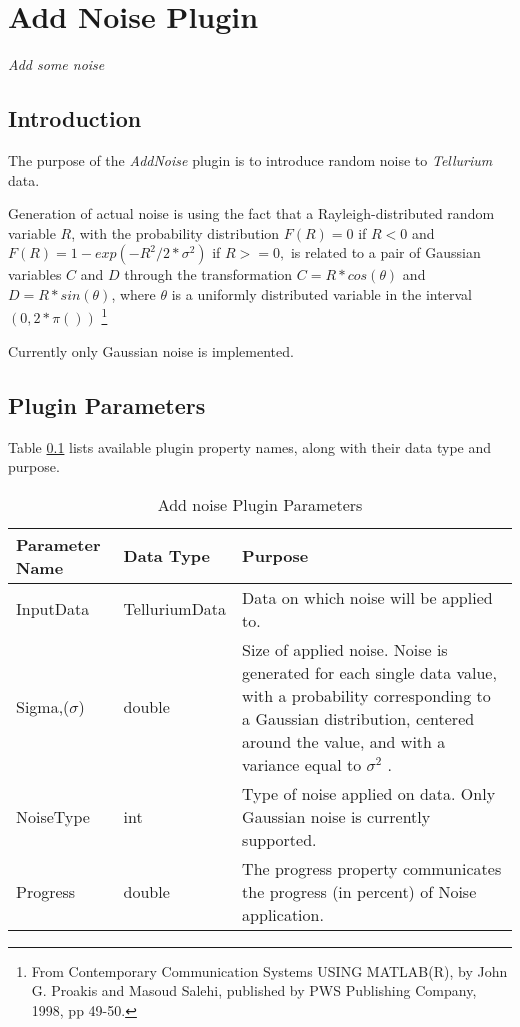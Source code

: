 \chapter*{Add Noise Plugin}
\setcounter{chapter}{1}
\emph{Add some noise}
\section{Introduction}
The purpose of the \emph{AddNoise} plugin is to introduce random noise to \emph{Tellurium} data. 

Generation of actual noise is using the fact that a Rayleigh-distributed random variable $R$, with
the probability distribution $F(R) = 0$ if $R < 0$ and $F(R) = 1 - exp(-R^2/2*\sigma^2)$ if $R >= 0, $
is related to a pair of Gaussian variables $C$ and $D$ through the transformation $C = R * cos(\theta)$ and
$D = R * sin(\theta)$, where $\theta$ is a uniformly distributed variable
in the interval $(0, 2*\pi())$ \footnote{From Contemporary Communication Systems
USING MATLAB(R), by John G. Proakis and Masoud Salehi, published by
PWS Publishing Company, 1998, pp 49-50.} 

Currently only Gaussian noise is implemented. 

\section{Plugin Parameters}
Table \ref{table:AddNoisePluginParameters} lists available plugin property names, along with their data type and purpose.


\begin{table}[ht]
\centering %
\begin{tabular}{l l p{7.5cm}} %

Parameter Name & Data Type & Purpose \\ [0.5ex] %
\hline %
InputData         		& 	TelluriumData & Data on which noise will be applied to. \\
Sigma,($\sigma$)      	& 	double & Size of applied noise. Noise is generated for each single data value, with a probability corresponding to a Gaussian distribution, centered around the value, and with a variance equal to $\sigma^2$ .\\
NoiseType      	& 	int    & Type of noise applied on data. Only Gaussian noise is currently supported. \\
Progress     	& 	double  & The progress property communicates the progress (in percent) of Noise application. \\

\hline %
\end{tabular}
\caption{Add noise Plugin Parameters} 
\label{table:AddNoisePluginParameters} 
\end{table}

